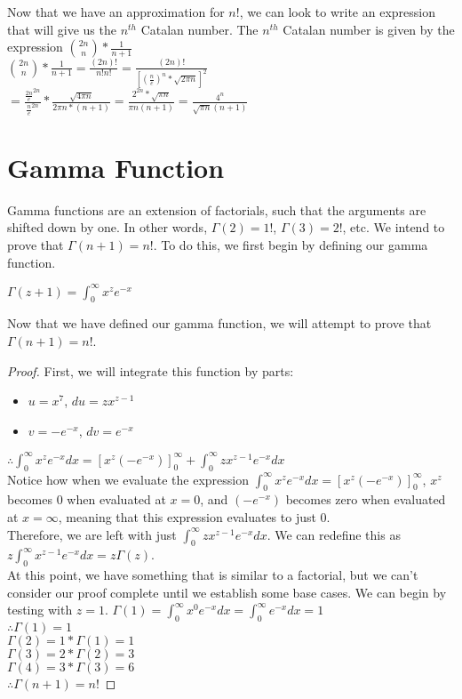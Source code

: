 Now that we have an approximation for $n!$, we can look to write an expression that will give us the $n^{th}$ Catalan number. The $n^{th}$ Catalan number is given by the expression $\binom {2n} n*\frac{1}{n+1}$\\
$\binom{2n}n*\frac{1}{n+1} = \frac{(2n)!}{n!n!} = \frac{(2n)!}{[(\frac{n}{e})^n * \sqrt{2\pi n}]^2}$\\
$= \frac{\frac{2n}{e}^{2n}}{\frac{n}{e}^{2n}} * \frac{\sqrt{4\pi n}}{2\pi n * (n+1)} = \frac{2^{2n}*\sqrt{\pi n}}{\pi n(n+1)} = \frac{4^n}{\sqrt{\pi n}(n+1)}$

\section{Gamma Function}
Gamma functions are an extension of factorials, such that the arguments are shifted down by one. In other words, $\Gamma(2) = 1!$, $\Gamma(3) = 2!$, etc. We intend to prove that $\Gamma(n+1) = n!$. To do this, we first begin by defining our gamma function.\\
\begin{definition}
    $\Gamma(z+1)=\int_{0}^{\infty} {x^{z}e^{-x}}$
\end{definition}
Now that we have defined our gamma function, we will attempt to prove that $\Gamma(n+1) = n!$.\\
\begin{proof}
First, we will integrate this function by parts:
\begin{multicols}{2}
\begin{itemize}
    \item $u = x^7$, $du = zx^{z-1}$
    \item $v = -e^{-x}$, $dv=e^{-x}$
\end{itemize}
\end{multicols}
$\therefore \int_{0}^{\infty}{x^{z}e^{-x}dx} = [x^{z}(-e^{-x})]_{0}^{\infty} + \int_{0}^{\infty}{zx^{z-1}e^{-x}dx}$\\

Notice how when we evaluate the expression $\int_{0}^{\infty}{x^{z}e^{-x}dx} = [x^{z}(-e^{-x})]_{0}^{\infty}$, $x^{z}$ becomes $0$ when evaluated at $x=0$, and $(-e^{-x})$ becomes zero when evaluated at $x=\infty$, meaning that this expression evaluates to just $0$. \\

Therefore, we are left with just $\int_{0}^{\infty}{zx^{z-1}e^{-x}dx}$. We can redefine this as $z\int_{0}^{\infty}{x^{z-1}e^{-x}dx} = z\Gamma(z)$.\\

At this point, we have something that is similar to a factorial, but we can't consider our proof complete until we establish some base cases. We can begin by testing with $z=1$. $\Gamma(1) = \int_{0}^{\infty}{x^{0}e^{-x}}dx = \int_{0}^{\infty}{e^{-x}}dx = 1$\\
$\therefore \Gamma(1) = 1$\\
$\Gamma(2) = 1 * \Gamma(1) = 1$\\
$\Gamma(3) = 2 * \Gamma(2) = 3$\\
$\Gamma(4) = 3 * \Gamma(3) = 6$\\
$\therefore \Gamma(n+1) = n!$
\end{proof}
